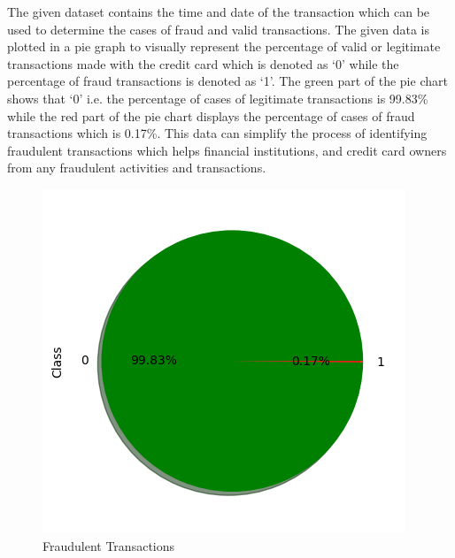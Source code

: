The given dataset contains the time and date of the transaction which can be used to determine the cases of fraud and valid transactions. The given data is plotted in a pie graph to visually represent the percentage of valid or legitimate transactions made with the credit card which is denoted as ‘0’ while the percentage of fraud transactions is denoted as ‘1’. The green part of the pie chart shows that ‘0’ i.e. the percentage of cases of legitimate transactions is 99.83\% while the red part of the pie chart displays the percentage of cases of fraud transactions which is 0.17\%. This data can simplify the process of identifying fraudulent transactions which helps financial institutions, and credit card owners from any fraudulent activities and transactions.


\begin{figure}[ht]
    \centering
    \includegraphics[scale=1]{figures/Preprocessing.png}
    \caption{Fraudulent Transactions}
    \label{fig:Data Preprocessing}
\end{figure}


\clearpage

